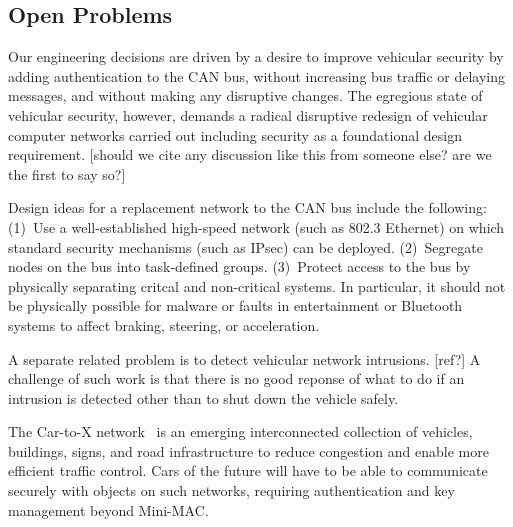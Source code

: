 


\subsection{Open Problems}
\label{open}

Our engineering decisions are driven by a desire to improve vehicular security by adding authentication
to the CAN bus, without increasing bus traffic or delaying messages, and without making any
disruptive changes.  The egregious state of vehicular security, however, demands a radical disruptive
redesign of vehicular computer networks carried out including security as a foundational design
requirement. [should we cite any discussion like this from someone else?  are we the first to say so?]

Design ideas for a replacement network to the CAN bus include the following:  
(1)~Use a well-established high-speed network (such as 802.3 Ethernet) on which
standard security mechanisms (such as IPsec) can be deployed.
(2)~Segregate nodes on the bus into task-defined groups.
(3)~Protect access to the bus by physically separating critcal and non-critical systems.
In particular, it should not be physically possible for malware or faults in entertainment or 
Bluetooth systems to affect braking, steering, or acceleration.  

A separate related problem is to detect vehicular network intrusions. [ref?]  A challenge of such work is that
there is no good reponse of what to do if an intrusion is detected other than to shut down the vehicle safely.

The Car-to-X network~\cite{C2X} is an emerging interconnected collection of vehicles, buildings, signs, and road infrastructure 
to reduce congestion and enable more efficient traffic control. Cars of the future will have to be able to communicate
securely with objects on such networks, requiring authentication and key management beyond Mini-MAC.



